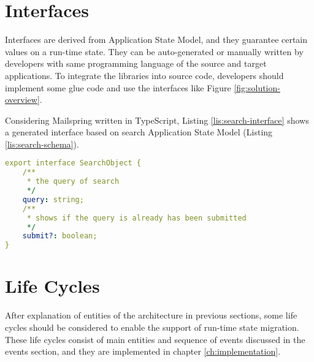 \section{Interfaces}
Interfaces are derived from Application State Model, and they guarantee certain values on a run-time state. They can be auto-generated or manually written by developers with same programming language of the source and target applications.
To integrate the libraries into source code, developers should implement some glue code and use the interfaces like Figure \ref{fig:solution-overview}.

Considering Mailspring written in TypeScript, Listing \ref{lis:search-interface} shows a generated interface based on search Application State Model (Listing \ref{lis:search-schema}).
\lstset{
  label=lis:search-interface, caption=Note Writing example interface in TypeScript.
}
\begin{lstlisting}[language=yaml]
export interface SearchObject {
    /**
     * the query of search
     */
    query: string;
    /**
     * shows if the query is already has been submitted
     */
    submit?: boolean;
}


\end{lstlisting}

\section{Life Cycles}
After explanation of entities of the architecture in previous sections, some life cycles should be considered to enable the support of run-time state migration. These life cycles consist of main entities and sequence of events discussed in the events section, and they are implemented in chapter \ref{ch:implementation}. 

